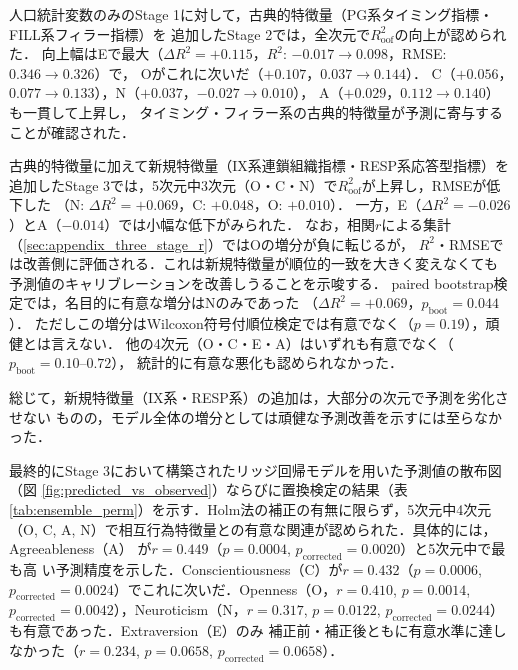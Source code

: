 \documentclass[dvipdfmx,11pt,a4paper]{bxjsarticle}
\renewcommand{\_}{\paperorigunderscore\allowbreak}%
\begin{document}
人口統計変数のみのStage 1に対して，古典的特徴量（PG系タイミング指標・FILL系フィラー指標）を
追加したStage 2では，全次元で$R^2_{\text{oof}}$の向上が認められた．
向上幅はEで最大（$\Delta R^2 = +0.115$，$R^2$: $-0.017 \to 0.098$，RMSE: $0.346 \to 0.326$）で，
Oがこれに次いだ（$+0.107$，$0.037 \to 0.144$）．
C（$+0.056$，$0.077 \to 0.133$），N（$+0.037$，$-0.027 \to 0.010$），
A（$+0.029$，$0.112 \to 0.140$）も一貫して上昇し，
タイミング・フィラー系の古典的特徴量が予測に寄与することが確認された．

古典的特徴量に加えて新規特徴量（IX系連鎖組織指標・RESP系応答型指標）を
追加したStage 3では，5次元中3次元（O・C・N）で$R^2_{\text{oof}}$が上昇し，RMSEが低下した
（N: $\Delta R^2 = +0.069$，C: $+0.048$，O: $+0.010$）．
一方，E（$\Delta R^2 = -0.026$）とA（$-0.014$）では小幅な低下がみられた．
なお，相関$r$による集計（\ref{sec:appendix_three_stage_r}）ではOの増分が負に転じるが，
$R^2$・RMSEでは改善側に評価される．これは新規特徴量が順位的一致を大きく変えなくても
予測値のキャリブレーションを改善しうることを示唆する．
paired bootstrap検定では，名目的に有意な増分はNのみであった
（$\Delta R^2 = +0.069$，$p_{\text{boot}} = 0.044$）．
ただしこの増分はWilcoxon符号付順位検定では有意でなく（$p = 0.19$），頑健とは言えない．
他の4次元（O・C・E・A）はいずれも有意でなく（$p_{\text{boot}} = 0.10$--$0.72$），
統計的に有意な悪化も認められなかった．

総じて，新規特徴量（IX系・RESP系）の追加は，大部分の次元で予測を劣化させない
ものの，モデル全体の増分としては頑健な予測改善を示すには至らなかった．



最終的にStage 3において構築されたリッジ回帰モデルを用いた予測値の散布図（図
\ref{fig:predicted_vs_observed}）ならびに置換検定の結果（表
\ref{tab:ensemble_perm}）を示す．Holm法の補正の有無に限らず，5次元中4次元（O, C,
A, N）で相互行為特徴量との有意な関連が認められた．具体的には，Agreeableness（A）
が$r = 0.449$（$p = 0.0004$, $p_{\text{corrected}} = 0.0020$）と5次元中で最も高
い予測精度を示した．Conscientiousness（C）が$r = 0.432$（$p = 0.0006$,
$p_{\text{corrected}} = 0.0024$）でこれに次いだ．Openness（O，$r = 0.410$, $p =
0.0014$, $p_{\text{corrected}} = 0.0042$），Neuroticism（N，$r = 0.317$, $p =
0.0122$, $p_{\text{corrected}} = 0.0244$）も有意であった．Extraversion（E）のみ
補正前・補正後ともに有意水準に達しなかった（$r = 0.234$, $p = 0.0658$,
$p_{\text{corrected}} = 0.0658$）．
\end{document}
